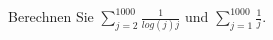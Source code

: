 \begin{aufg}[0]
Berechnen Sie $\sum_{j=2}^{1000} \frac{1}{log(j)j}$ und
  $\sum_{j=1}^{1000} \frac{1}{j}$.
\end{aufg}